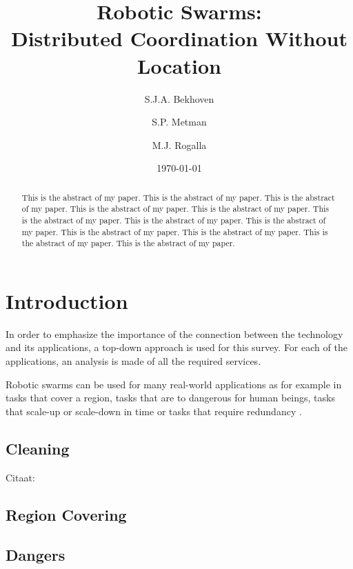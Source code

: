 \documentclass[a4paper]{article}
\title{Robotic Swarms: \\Distributed Coordination Without Location}
\author{S.J.A. Bekhoven  \and
    S.P. Metman \and
    M.J. Rogalla}
\date{\today}
\begin{document}
\maketitle
\thispagestyle{empty}

\begin{abstract}
This is the abstract of my paper.
This is the abstract of my paper.
This is the abstract of my paper.
This is the abstract of my paper.
This is the abstract of my paper.
This is the abstract of my paper.
This is the abstract of my paper.
This is the abstract of my paper.
This is the abstract of my paper.
This is the abstract of my paper.
This is the abstract of my paper.
This is the abstract of my paper.
\end{abstract}


\section{Introduction}
  In order to emphasize the importance of the connection between the technology and its applications, a top-down approach is used for this survey. For each of the applications, an analysis is made of all the required services.
  
  	Robotic swarms can be used for many real-world applications as for example in tasks that cover a region, tasks that are to dangerous for human beings, tasks that scale-up or scale-down in time or tasks that require redundancy \cite{csahin2005swarm}.
	
  \subsection{Cleaning}
  Citaat: \cite{wagner2008cooperative} \cite{altshuler2005swarm}
  
  \subsection{Region Covering}
  \subsection{Dangers}
\end{document}
